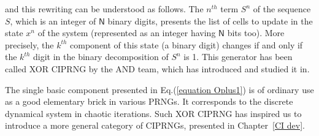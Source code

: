 \noindent and this rewriting can be understood as follows. The $n^{th}$ term $S^n$ of the sequence $S$, 
which is an integer of $\mathsf{N}$ binary digits, presents
the list of cells to update in the state $x^n$ of the system (represented as an integer 
having $\mathsf{N}$ bits too). More precisely, the $k^{th}$
component of this state (a binary digit) changes if and only if the $k^{th}$ digit in the 
binary decomposition of $S^n$ is 1. This generator has been called XOR CIPRNG by
the AND team, which has introduced and studied it in\cite{DBLP:journals/corr/abs-1112-5239, bfg12a:ip}.

The single basic component presented in Eq.(\ref{equation Oplus1}) is of ordinary use as a 
good elementary brick in various PRNGs. It corresponds
to the discrete dynamical system in chaotic iterations.
Such XOR CIPRNG has inspired us to introduce a more general category of CIPRNGs, presented
in Chapter~\ref{CI dev}.
%
%
%
%

